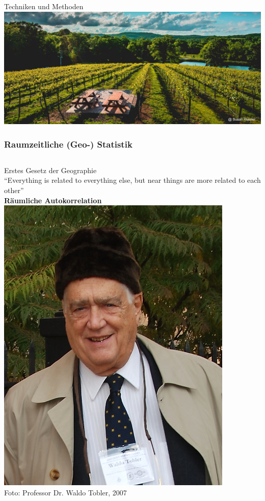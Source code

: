 \documentclass{beamer}
\begin{document}
\begin{frame}
\frametitle{}
\centering
\Huge \alert{Techniken und Methoden}\\[0.5cm]
\includegraphics[width=\textwidth]{Figures/wine.png}
\end{frame}


\begin{frame}
\frametitle{Raumzeitliche (Geo-) Statistik}
\begin{columns}
\alert{Erstes Gesetz der Geographie}\\[0.5cm]
``Everything is related to everything else, but near things are more related to each other''\\[0.5cm]
\textbf{Räumliche Autokorrelation}\\
\hspace{2cm}
\raggedleft
\includegraphics[width=0.85\textwidth]{Figures/Tobler_2007.png}\\
\tiny Foto: Professor Dr. Waldo Tobler, 2007
\end{columns}
\end{frame}
\end{document}
